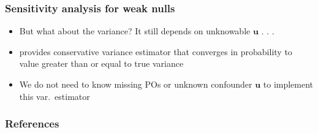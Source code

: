 \documentclass[table, xcolor = {dvipsnames}, 9pt]{beamer}
\theoremstyle{plain}
\begin{document}
\begin{frame}[t]
\frametitle{Sensitivity analysis for weak nulls} 
\vfill
\begin{itemize} \vfill
\item But what about the variance? It still depends on unknowable $\bm{u}$ . . .  \vfill
\item \citet{fogarty2018} provides conservative variance estimator that converges in probability to value greater than or equal to true variance \vfill
\item We do not need to know missing POs or unknown confounder $\bm{u}$ to implement this var.~estimator \vfill
\end{itemize}  
\vfill
\end{frame}
\begin{frame}[allowframebreaks]
\frametitle{References} 
\scriptsize

\end{frame}
\end{document}
